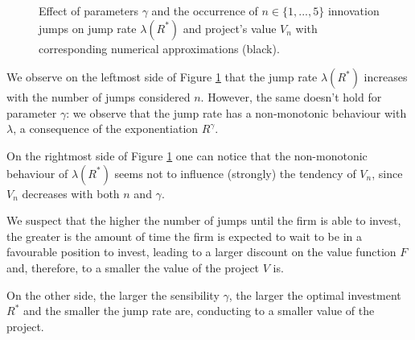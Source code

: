 \begin{figure}[!htb]
	\begin{subfigmatrix}{2}
	\end{subfigmatrix}
	\caption{Effect of parameters $\gamma$ and the occurrence of $n\in \{1,...,5\}$ innovation jumps on jump rate $\lambda(R^*)$ and project's value $V_n$ with corresponding numerical approximations (black). }
	\label{fig:max_n}
\end{figure}


We observe on the leftmost side of Figure \ref{fig:max_n} that the jump rate $\lambda(R^*)$ increases with the number of jumps considered $n$. However, the same doesn't hold for parameter $\gamma$: we observe that the jump rate has a non-monotonic behaviour with $\lambda$, a consequence of the exponentiation $R^\gamma$.



On the rightmost side of Figure \ref{fig:max_n} one can notice that the non-monotonic behaviour of $\lambda(R^*)$ seems not to influence (strongly) the tendency of $V_n$, since $V_n$ decreases with both $n$ and $\gamma$.

We suspect that the higher the number of jumps until the firm is able to invest, the greater is the amount of time the firm is expected to wait to be in a favourable position to invest, leading to a larger discount on the value function $F$ and, therefore, to a smaller the value of the project $V$ is. 

On the other side, the larger the sensibility $\gamma$, the larger the optimal investment $R^*$ and the smaller the jump rate are, conducting to a smaller value of the project.


